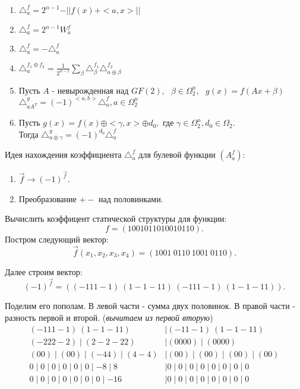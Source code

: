 \utv
\begin{enumerate}
	\item $\triangle_a^f = 2^{n - 1} - \vert\vert f(x) + <a, x> \vert\vert$
	\item $\triangle_a^f = 2^{n - 1} W_a^f$
	\item $\triangle_a^f = -\triangle_a^f$
	\item $\triangle_a^{f_1 \oplus f_2} = \frac{1}{2^{n - 1}} \sum_{\beta}\triangle_{\beta}^{f_1}\triangle_{a \oplus \beta}^{f_2}$
	\item Пусть $A$ - невырожденная над $GF(2),\text{ } \beta \in \Omega_2^n,\text{ } g(x) = f(Ax + \beta) \text{ }$\\
	$\triangle_{aA^T}^g = (-1)^{<a,b>}\triangle_a^f, a \in \Omega_2^n$

	\item Пусть $g(x) = f(x) \oplus <\gamma, x> \oplus d_0, $ где $\gamma \in \Omega_2^n, d_0 \in \Omega_2$.\\
	Тогда $\triangle_{a\oplus\gamma}^g = (-1)^{d_0}\triangle_a^f$
\end{enumerate}

Идея нахождения коэффициента $\triangle_a^f$ для булевой функции $(A_a^f)$:
\begin{enumerate}
	\item $\overrightarrow{f} \rightarrow (-1)^{\overrightarrow{f}}$.
	\item Преобразование $+-$ над половинками.
\end{enumerate}

\examplei
Вычислить коэффицент статической структуры для функции:
$$
	f = (1 0 0 1 0 1 1 0 1 0 0 1 0 1 1 0).
$$
Постром следующий вектор:
$$
	\vec{f}(x_1, x_2, x_3, x_4) = (1 0 0 1 \  0110\  1001\  0110).
$$

Далее строим вектор:
$$
(-1)^{\vec{f}} = ((-\!1 1 1\!-\!1) \  (1\!-\!1\!-\!11)\  (-\!111\!-\!1) \  (1\!-\!1\!-\!11)).
$$

Поделим его пополам. В левой части - сумма двух половинок. В правой части - разность первой и второй. (\emph{вычитаем из первой вторую})
\begin{align*}
	(-\!111\!-\!1) \ (1\!-\!1\!-\!11) &\mid (-\!11\!-\!1) \ (1\!-\!1\!-\!11)\\
	(-\!222\!-\!2) \mid (2\!-\!2\!-\!22) &\mid (0000) \mid (0000)\\
	(00) \mid (00) \mid (-\!44) \mid (4\!-\!4) &\mid (00) \mid (00) \mid (00) \mid (00)\\
	0 \mid 0 \mid 0 \mid 0 \mid 0 \mid 0 \mid -\!8 \mid 8 &\mid 0 \mid 0 \mid 0 \mid 0 \mid 0 \mid 0 \mid 0 \mid 0\\
	0 \mid 0 \mid 0 \mid 0 \mid 0 \mid 0 \mid 0 \mid -\!16 &\mid 0 \mid 0 \mid 0 \mid 0 \mid 0 \mid 0 \mid 0 \mid 0 
\end{align*}

